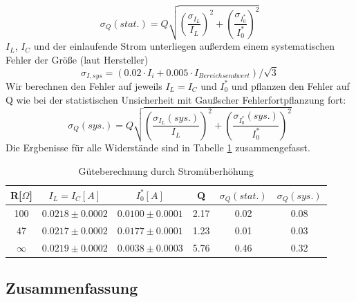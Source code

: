 \documentclass[12pt,a4paper]{article}
\begin{document}
\begin{equation}
\sigma_Q(stat.)=Q\sqrt{\left(\frac{\sigma_{I_L}}{I_L}\right)^2+\left(\frac{\sigma_{I_0^*}}{I_0^*}\right)^2}
\end{equation}
$I_L$, $I_C$ und der einlaufende Strom unterliegen außerdem einem systematischen Fehler der Größe (laut Hersteller)
\begin{equation}
\sigma_{I,sys}=(0.02\cdot I_i+0.005\cdot I_{Bereichsendwert})/\sqrt{3}
\end{equation}
Wir berechnen den Fehler auf jeweils $I_L=I_C$ und $I_0^*$ und pflanzen den Fehler auf Q wie bei der statistischen Unsicherheit mit Gaußscher Fehlerfortpflanzung fort:
\begin{equation}
\sigma_Q(sys.)=Q\sqrt{\left(\frac{\sigma_{I_L}(sys.)}{I_L}\right)^2+\left(\frac{\sigma_{I_0^*}(sys.)}{I_0^*}\right)^2}
\end{equation}
Die Ergbenisse für alle Widerstände sind in Tabelle \ref{table:P_I} zusammengefasst.
\begin{table}[H]
	\centering
	\begin{tabular}{|c|c|c|c|c|c|}
		\hline
		R[$\Omega$]&$I_L=I_C[A]$&$I_0^*[A]$&Q&$\sigma_Q(stat.)$&$\sigma_Q(sys.)$\\
		\hline
		100&$0.0218\pm0.0002$&$0.0100\pm0.0001$&2.17&0.02&0.08\\
		47&$0.0217\pm0.0002$&$0.0177\pm0.0001$&1.23&0.01&0.03\\
		$\infty$&$0.0219\pm0.0002$&$0.0038\pm0.0003$&5.76&0.46&0.32\\
		\hline		
	\end{tabular}
	\caption{Güteberechnung durch Stromüberhöhung}
	\label{table:P_I}
\end{table}







\subsection{Zusammenfassung}
\end{document}
